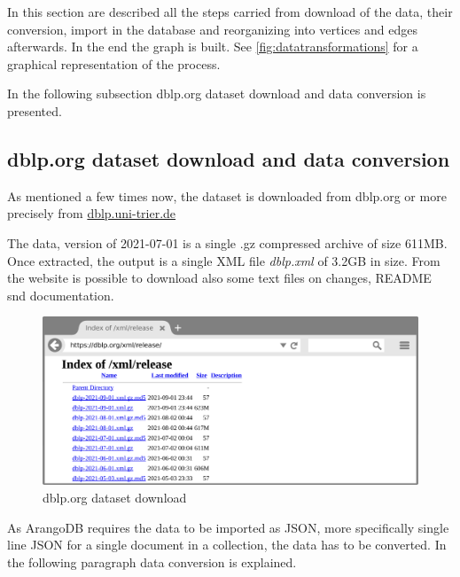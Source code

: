 In this section are described all the steps carried from download of the data, their conversion, import in the database and reorganizing into vertices and edges afterwards. In the end the graph is built. See \hyperref[fig:datatransformations]{\autoref{fig:datatransformations}} for a graphical representation of the process.

In the following subsection \gls{dblp.org} dataset download and data conversion is presented.

\subsection[dblp.org dataset download and data conversion]{\gls{dblp.org} dataset download and data conversion} \label{subsection:ImplementingtheWebApp/Thedata/dblpcomdatasetdownloadanddataconversion}
As mentioned a few times now, the dataset is downloaded from \gls{dblp.org} or more precisely from \url{dblp.uni-trier.de}

The data, version of 2021-07-01 is a single .gz compressed archive of size 611MB.
Once extracted, the output is a single XML file \textit{dblp.xml} of 3.2GB in size.
From the website is possible to download also some text files on changes, README snd documentation.

\begin{figure}[H]%
	\centering%
	\includegraphics[width=1\textwidth]{images/chapter4/dblpdatasetdownload.pdf}%
	\caption[dblp dataset download]{\gls{dblp.org} dataset download}%
	\label{fig:dblpdatasetdownload}
\end{figure}%

As ArangoDB requires the data to be imported as JSON, more specifically single line JSON for a single document in a collection, the data has to be converted.
In the following paragraph data conversion is explained.
\bigskip

